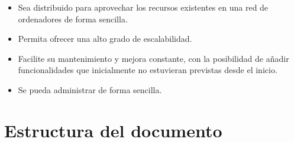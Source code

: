 \begin{itemize}
	\item Sea distribuido para aprovechar los recursos existentes en una red de ordenadores de forma sencilla.
	
	\item Permita ofrecer una alto grado de escalabilidad.
	
	\item Facilite su mantenimiento y mejora constante, con la posibilidad de añadir funcionalidades que inicialmente no estuvieran previstas desde el inicio.
	
	\item Se pueda administrar de forma sencilla.
\end{itemize}

\section{Estructura del documento}

